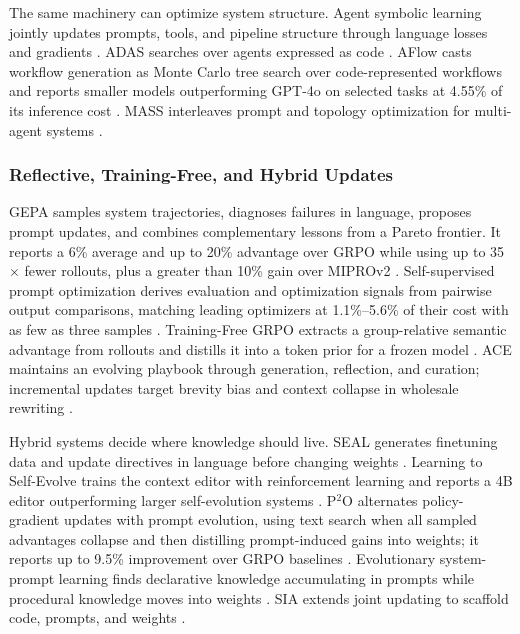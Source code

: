 The same machinery can optimize system structure. Agent symbolic learning jointly updates prompts, tools, and pipeline structure through language losses and gradients \citep{zhou2024symbolic}. ADAS searches over agents expressed as code \citep{hu2024automated}. AFlow casts workflow generation as Monte Carlo tree search over code-represented workflows and reports smaller models outperforming GPT-4o on selected tasks at 4.55\% of its inference cost \citep{zhang2024aflow}. MASS interleaves prompt and topology optimization for multi-agent systems \citep{zhou2025multiagent}.

\subsubsection{Reflective, Training-Free, and Hybrid Updates}
\label{supp:optimizer-reflective-hybrid}

GEPA samples system trajectories, diagnoses failures in language, proposes prompt updates, and combines complementary lessons from a Pareto frontier. It reports a 6\% average and up to 20\% advantage over GRPO while using up to 35$\times$ fewer rollouts, plus a greater than 10\% gain over MIPROv2 \citep{agrawal2026gepa}. Self-supervised prompt optimization derives evaluation and optimization signals from pairwise output comparisons, matching leading optimizers at 1.1\%--5.6\% of their cost with as few as three samples \citep{xiang2025selfsupervised}. Training-Free GRPO extracts a group-relative semantic advantage from rollouts and distills it into a token prior for a frozen model \citep{cai2025trainingfree}. ACE maintains an evolving playbook through generation, reflection, and curation; incremental updates target brevity bias and context collapse in wholesale rewriting \citep{zhang2025agentic}.

Hybrid systems decide where knowledge should live. SEAL generates finetuning data and update directives in language before changing weights \citep{zweiger2025selfadapting}. Learning to Self-Evolve trains the context editor with reinforcement learning and reports a 4B editor outperforming larger self-evolution systems \citep{chen2026learning}. P$^2$O alternates policy-gradient updates with prompt evolution, using text search when all sampled advantages collapse and then distilling prompt-induced gains into weights; it reports up to 9.5\% improvement over GRPO baselines \citep{lu2026p2o}. Evolutionary system-prompt learning finds declarative knowledge accumulating in prompts while procedural knowledge moves into weights \citep{zhang2026evolutionary}. SIA extends joint updating to scaffold code, prompts, and weights \citep{hebbar2026sia}.

